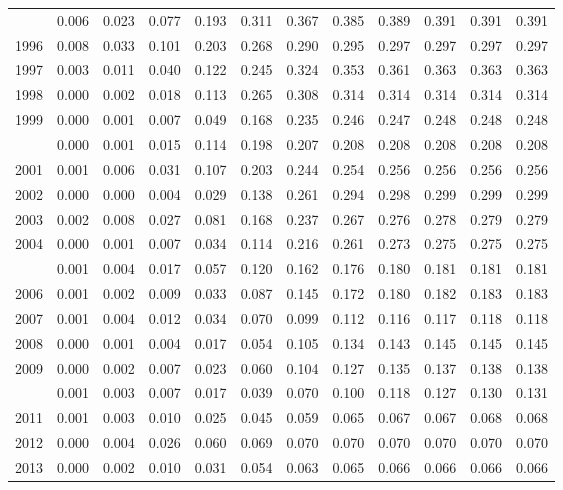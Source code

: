 \documentclass[
]{article}
\begin{document}
\begin{longtable}[t]{lrrrrrrrrrrr}
\addlinespace
1995 & 0.006 & 0.023 & 0.077 & 0.193 & 0.311 & 0.367 & 0.385 & 0.389 & 0.391 & 0.391 & 0.391\\
1996 & 0.008 & 0.033 & 0.101 & 0.203 & 0.268 & 0.290 & 0.295 & 0.297 & 0.297 & 0.297 & 0.297\\
1997 & 0.003 & 0.011 & 0.040 & 0.122 & 0.245 & 0.324 & 0.353 & 0.361 & 0.363 & 0.363 & 0.363\\
1998 & 0.000 & 0.002 & 0.018 & 0.113 & 0.265 & 0.308 & 0.314 & 0.314 & 0.314 & 0.314 & 0.314\\
1999 & 0.000 & 0.001 & 0.007 & 0.049 & 0.168 & 0.235 & 0.246 & 0.247 & 0.248 & 0.248 & 0.248\\
\addlinespace
2000 & 0.000 & 0.001 & 0.015 & 0.114 & 0.198 & 0.207 & 0.208 & 0.208 & 0.208 & 0.208 & 0.208\\
2001 & 0.001 & 0.006 & 0.031 & 0.107 & 0.203 & 0.244 & 0.254 & 0.256 & 0.256 & 0.256 & 0.256\\
2002 & 0.000 & 0.000 & 0.004 & 0.029 & 0.138 & 0.261 & 0.294 & 0.298 & 0.299 & 0.299 & 0.299\\
2003 & 0.002 & 0.008 & 0.027 & 0.081 & 0.168 & 0.237 & 0.267 & 0.276 & 0.278 & 0.279 & 0.279\\
2004 & 0.000 & 0.001 & 0.007 & 0.034 & 0.114 & 0.216 & 0.261 & 0.273 & 0.275 & 0.275 & 0.275\\
\addlinespace
2005 & 0.001 & 0.004 & 0.017 & 0.057 & 0.120 & 0.162 & 0.176 & 0.180 & 0.181 & 0.181 & 0.181\\
2006 & 0.001 & 0.002 & 0.009 & 0.033 & 0.087 & 0.145 & 0.172 & 0.180 & 0.182 & 0.183 & 0.183\\
2007 & 0.001 & 0.004 & 0.012 & 0.034 & 0.070 & 0.099 & 0.112 & 0.116 & 0.117 & 0.118 & 0.118\\
2008 & 0.000 & 0.001 & 0.004 & 0.017 & 0.054 & 0.105 & 0.134 & 0.143 & 0.145 & 0.145 & 0.145\\
2009 & 0.000 & 0.002 & 0.007 & 0.023 & 0.060 & 0.104 & 0.127 & 0.135 & 0.137 & 0.138 & 0.138\\
\addlinespace
2010 & 0.001 & 0.003 & 0.007 & 0.017 & 0.039 & 0.070 & 0.100 & 0.118 & 0.127 & 0.130 & 0.131\\
2011 & 0.001 & 0.003 & 0.010 & 0.025 & 0.045 & 0.059 & 0.065 & 0.067 & 0.067 & 0.068 & 0.068\\
2012 & 0.000 & 0.004 & 0.026 & 0.060 & 0.069 & 0.070 & 0.070 & 0.070 & 0.070 & 0.070 & 0.070\\
2013 & 0.000 & 0.002 & 0.010 & 0.031 & 0.054 & 0.063 & 0.065 & 0.066 & 0.066 & 0.066 & 0.066\\

\end{longtable}
\end{document}
